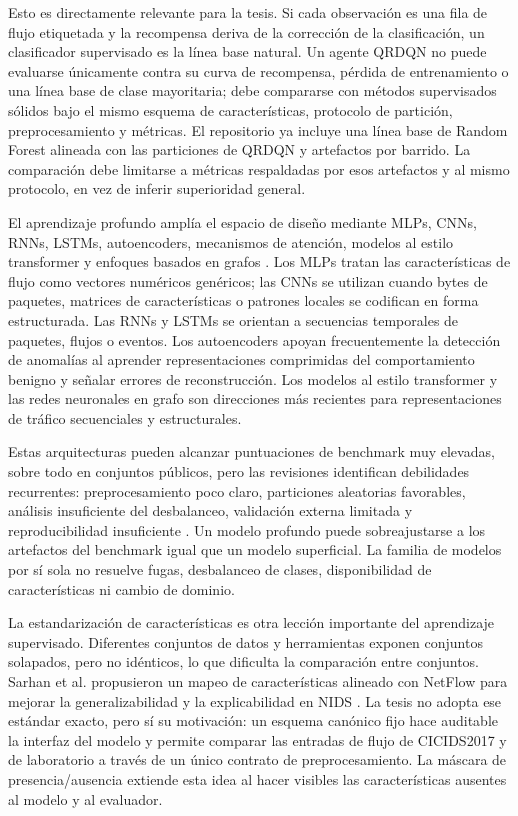 Esto es directamente relevante para la tesis. Si cada observación es una fila de flujo etiquetada y la recompensa deriva de la corrección de la clasificación, un clasificador supervisado es la línea base natural. Un agente QRDQN no puede evaluarse únicamente contra su curva de recompensa, pérdida de entrenamiento o una línea base de clase mayoritaria; debe compararse con métodos supervisados sólidos bajo el mismo esquema de características, protocolo de partición, preprocesamiento y métricas. El repositorio ya incluye una línea base de Random Forest alineada con las particiones de QRDQN y artefactos por barrido. La comparación debe limitarse a métricas respaldadas por esos artefactos y al mismo protocolo, en vez de inferir superioridad general.

El aprendizaje profundo amplía el espacio de diseño mediante MLPs, CNNs, RNNs, LSTMs, autoencoders, mecanismos de atención, modelos al estilo transformer y enfoques basados en grafos \parencite{Xiao2021DLIDSSurvey,Asadullah2023MLIDSSurvey,Sayeeduddin2022AINIDS,Nguyen2022BERTFlowNIDS}. Los MLPs tratan las características de flujo como vectores numéricos genéricos; las CNNs se utilizan cuando bytes de paquetes, matrices de características o patrones locales se codifican en forma estructurada. Las RNNs y LSTMs se orientan a secuencias temporales de paquetes, flujos o eventos. Los autoencoders apoyan frecuentemente la detección de anomalías al aprender representaciones comprimidas del comportamiento benigno y señalar errores de reconstrucción. Los modelos al estilo transformer y las redes neuronales en grafo son direcciones más recientes para representaciones de tráfico secuenciales y estructurales.

Estas arquitecturas pueden alcanzar puntuaciones de benchmark muy elevadas, sobre todo en conjuntos públicos, pero las revisiones identifican debilidades recurrentes: preprocesamiento poco claro, particiones aleatorias favorables, análisis insuficiente del desbalanceo, validación externa limitada y reproducibilidad insuficiente \parencite{LiuLang2019IDSSurvey,Ring2019DatasetSurvey,Arp2020DosDontsMLSecurity}. Un modelo profundo puede sobreajustarse a los artefactos del benchmark igual que un modelo superficial. La familia de modelos por sí sola no resuelve fugas, desbalanceo de clases, disponibilidad de características ni cambio de dominio.

La estandarización de características es otra lección importante del aprendizaje supervisado. Diferentes conjuntos de datos y herramientas exponen conjuntos solapados, pero no idénticos, lo que dificulta la comparación entre conjuntos. Sarhan et al. propusieron un mapeo de características alineado con NetFlow para mejorar la generalizabilidad y la explicabilidad en NIDS \parencite{Sarhan2021}. La tesis no adopta ese estándar exacto, pero sí su motivación: un esquema canónico fijo hace auditable la interfaz del modelo y permite comparar las entradas de flujo de CICIDS2017 y de laboratorio a través de un único contrato de preprocesamiento. La máscara de presencia/ausencia extiende esta idea al hacer visibles las características ausentes al modelo y al evaluador.

